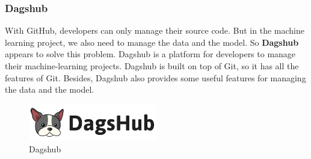 \subsubsection{Dagshub}
With GitHub, developers can only manage their source code. But in the machine learning project, we also need to manage the data and the model. So \textbf{Dagshub} appears to solve this problem.
Dagshub is a platform for developers to manage their machine-learning projects. Dagshub is built on top of Git, so it has all the features of Git. Besides, Dagshub also provides some useful features for managing the data and the model.

\begin{figure}[ht]
    \centering
    \includegraphics[width=0.5\textwidth]{../Images/8.Technology_Stack/dagshub_logo.png}
    \caption{Dagshub}
    \label{fig:dagshub}
\end{figure}

